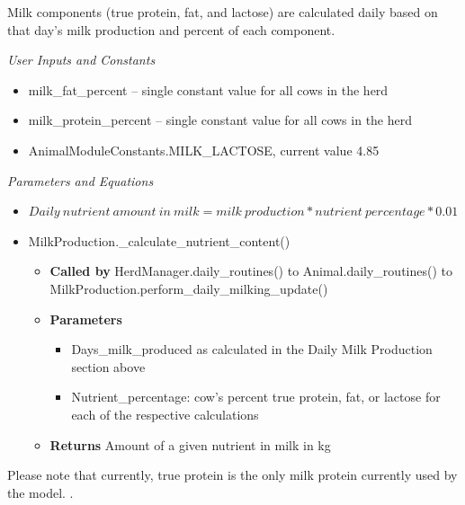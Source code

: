 \documentclass{article}
\begin{document}
\begin{refsection}
\begin{enumerate}
        Milk components (true protein, fat, and lactose) are calculated daily based on that day’s milk production and percent of each component. 
        \vspace{0.1cm}
        
         \textit{User Inputs and Constants}
         \vspace{0.1cm}

         \begin{itemize}
             \item milk\_fat\_percent – single constant value for all cows in the herd 
             \item milk\_protein\_percent – single constant value for all cows in the herd 
             \item AnimalModuleConstants.MILK\_LACTOSE, current value 4.85

         \end{itemize}

         \textit{Parameters and Equations}
         \vspace{0.1cm}

        \begin{itemize}
            \item \(Daily\ nutrient\ amount\ in\ milk = milk\ production * nutrient\ percentage * 0.01\)
            \item MilkProduction.\_calculate\_nutrient\_content()
            \begin{itemize}
                \item \textbf{Called by} HerdManager.daily\_routines() to Animal.daily\_routines() to MilkProduction.perform\_daily\_milking\_update()
                \item \textbf{Parameters} 
                \begin{itemize}
                    \item Days\_milk\_produced as calculated in the Daily Milk Production section above
                    \item Nutrient\_percentage: cow’s percent true protein, fat, or lactose for each of the respective calculations
                \end{itemize}
                \item \textbf{Returns} Amount of a given nutrient in milk in kg
            \end{itemize}
        \end{itemize}
         
        \begin{tcolorbox}[colback=white, colframe=black, boxrule=0.5pt, arc=3pt, width=\textwidth]
            Please note that currently, true protein is the only milk protein currently used by the model. .
        \end{tcolorbox}


\end{enumerate}
\end{refsection}
\end{document}
